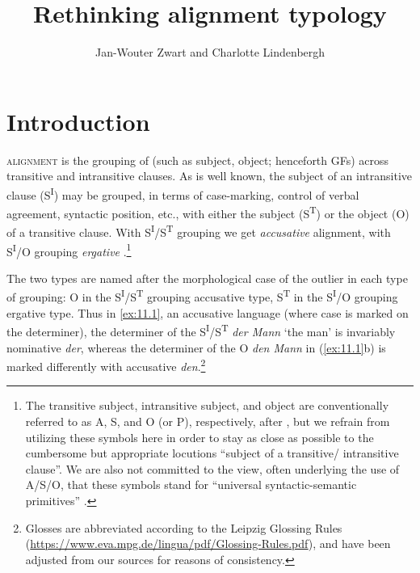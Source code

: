 \documentclass[output=paper]{langsci/langscibook}
\author{Jan-Wouter Zwart\affiliation{University of Groningen} and Charlotte Lindenbergh\affiliation{University of Groningen}}
\title{Rethinking alignment typology}
\begin{document}
\glsresetall
\maketitle

\section{Introduction}\label{sec:11.1}

\textsc{alignment} is the grouping of  (such as
subject, object; henceforth \glspl{GF}) across transitive and
intransitive clauses. As is well known, the subject of an intransitive clause
(S\textsuperscript{I}) may be grouped, in terms of case-marking, control of
verbal agreement, syntactic position, etc., with either the subject
(S\textsuperscript{T}) or the object (O) of a transitive clause. With
S\textsuperscript{I}/S\textsuperscript{T} grouping we get \emph{accusative}
alignment, with S\textsuperscript{I}/O grouping \emph{ergative} 
\parencite{Plank1979,Dixon1994,Deal2015}.\footnote{The transitive subject,
    intransitive subject, and object are conventionally referred to as A, S,
    and O (or P), respectively, after \textcite[xxiii]{Dixon1972}, but we
    refrain from utilizing these symbols here in order to stay as close as
    possible to the cumbersome but appropriate locutions \enquote{subject of a
    transitive/ intransitive clause}. We are also not committed to the view,
    often underlying the use of A/S/O, that these symbols stand for “universal
    syntactic-semantic primitives” \citep[6]{Dixon1994}.}

The two  types are named after the morphological case of the outlier
in each type of grouping: O in the S\textsuperscript{I}/S\textsuperscript{T}
grouping accusative type, S\textsuperscript{T} in the S\textsuperscript{I}/O
grouping ergative type. Thus in  \eqref{ex:11.1}, an accusative language (where case
is marked on the determiner), the determiner of the
S\textsuperscript{I}/S\textsuperscript{T} \emph{der Mann} ‘the man’ is
invariably nominative \emph{der}, whereas the determiner of the O \emph{den
    Mann} in (\ref{ex:11.1}b) is marked differently with accusative
    \emph{den}.\footnote{Glosses are abbreviated according to the Leipzig
        Glossing Rules
        (\url{https://www.eva.mpg.de/lingua/pdf/Glossing-Rules.pdf}), and have
    been adjusted from our sources for reasons of consistency.}
\end{document}
